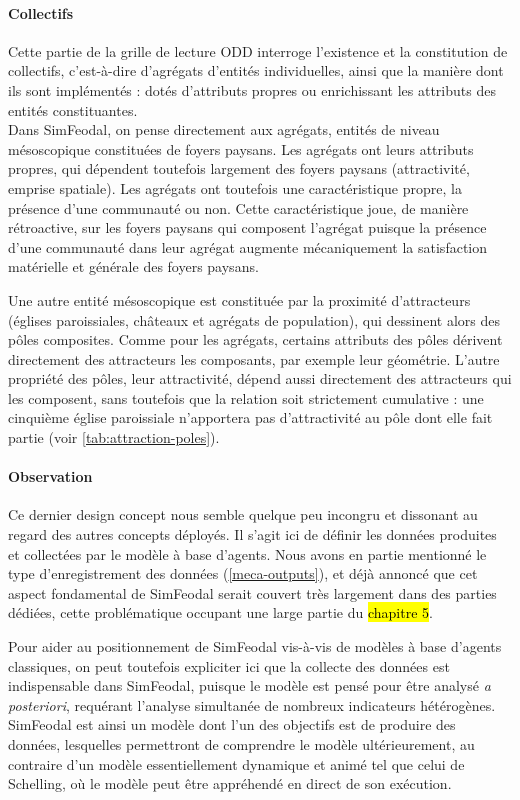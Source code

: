 \paragraph{Collectifs} Cette partie de la grille de lecture ODD interroge l'existence et la constitution de \og collectifs\fg{}, c'est-à-dire d'agrégats d'entités individuelles, ainsi que la manière dont ils sont implémentés : dotés
d'attributs propres ou enrichissant les attributs des entités constituantes.
\\
Dans SimFeodal, on pense directement aux agrégats, entités de niveau mésoscopique constituées de foyers paysans.
Les agrégats ont leurs attributs propres, qui dépendent toutefois largement des foyers paysans (attractivité, emprise spatiale).
Les agrégats ont toutefois une caractéristique propre, la présence d'une communauté ou non.
Cette caractéristique joue, de manière rétroactive, sur les foyers paysans qui composent l'agrégat puisque la présence d'une communauté dans leur agrégat augmente mécaniquement la satisfaction matérielle et générale des foyers paysans.

Une autre entité mésoscopique est constituée par la proximité d'attracteurs (églises paroissiales, châteaux et agrégats de population), qui dessinent alors des pôles composites.
Comme pour les agrégats, certains attributs des pôles dérivent directement des attracteurs les composants, par exemple leur géométrie.
L'autre propriété des pôles, leur attractivité, dépend aussi directement des attracteurs qui les composent, sans toutefois que la relation soit strictement cumulative : une cinquième église paroissiale n'apportera pas d'attractivité au pôle dont elle fait partie (voir \cref{tab:attraction-poles}).

\paragraph{Observation} Ce dernier \og design concept\fg{} nous semble quelque peu incongru et dissonant au regard des autres concepts déployés.
Il s'agit ici de définir les données produites et collectées par le modèle à base d'agents.
Nous avons en partie mentionné le type d'enregistrement des données (\cref{meca-outputs}), et déjà annoncé que cet aspect fondamental de SimFeodal serait couvert très largement dans des parties dédiées, cette problématique occupant une large partie du \hl{chapitre 5}.

Pour aider au positionnement de SimFeodal vis-à-vis de modèles à base d'agents classiques, on peut toutefois expliciter ici que la collecte des données est indispensable dans SimFeodal, puisque le modèle est pensé pour être analysé \textit{a posteriori}, requérant l'analyse simultanée de nombreux indicateurs hétérogènes.
SimFeodal est ainsi un modèle dont l'un des objectifs est de produire des données, lesquelles permettront de comprendre le modèle ultérieurement, au contraire d'un modèle essentiellement dynamique et \og animé\fg{} tel que celui de Schelling, où le modèle peut être appréhendé en direct de son exécution. 


